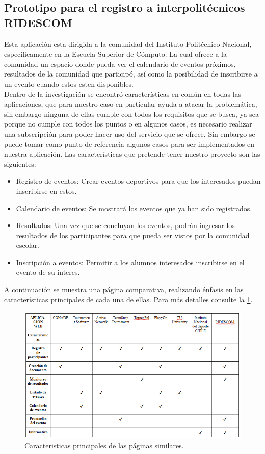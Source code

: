 \subsection{Prototipo para el registro a interpolitécnicos RIDESCOM}
\noindent Esta aplicación esta dirigida a la comunidad del Instituto Politécnico Nacional, especificamente en la Escuela Superior de Cómputo. La cual ofrece a la comunidad un espacio donde pueda ver el calendario de eventos próximos, resultados de la comunidad que participó, así como la posibilidad de inscribirse a un evento cuando estos esten disponibles. 
\\Dentro de la investigación se encontró características en común en todas las aplicaciones, que para nuestro caso en particular ayuda a atacar la problemática, sin embargo ninguna de ellas cumple con todos los requisitos que se busca, ya sea porque no cumple con todos los puntos o en algunos casos, es necesario realizar una subscripción para poder hacer uso del servicio que se ofrece. Sin embargo se puede tomar como punto de referencia algunos casos para ser implementados en nuestra aplicación.
Las características que pretende tener nuestro proyecto son las siguientes:
\begin{itemize}
	\item Registro de eventos: Crear eventos deportivos para que los interesados puedan inscribirse en estos.
	\item Calendario de eventos: Se mostrará los eventos que ya han sido registrados.
	\item Resultados: Una vez que se concluyan los eventos, podrán ingresar los resultados de los participantes para que pueda ser vistos por la comunidad escolar.
	\item Inscripción a eventos: Permitir a los alumnos interesados inscribirse en el evento de su interes. 
\end{itemize}

A continuación se muestra una página comparativa, realizando énfasis en las características principales de cada una de ellas. Para más detalles consulte la \ref{tablacomparativa}.

\begin{figure} [hbt!]
	\centering
	\includegraphics[width=17cm, height=cm]{Imagenes/tablaComparativa}
	\caption{Caracteristicas principales de las páginas similares.}
	\label{tablacomparativa}
\end{figure}

